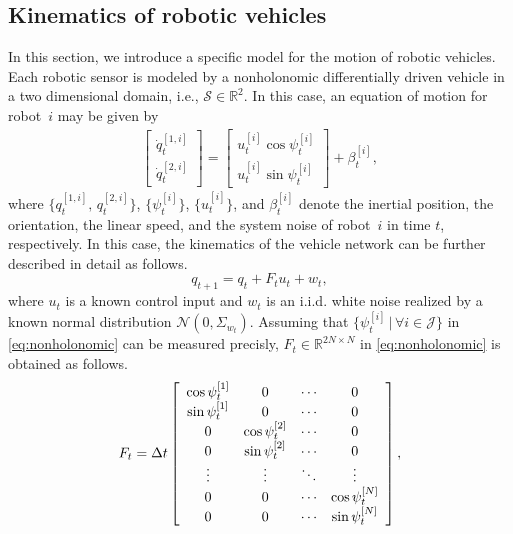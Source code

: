 \documentclass[letterpaper, 10 pt, conference]{ieeeconf}
\newcommand{\set}[1]{\{#1\}} \newcommand{\norm}[1]{\|#1\|}
\newcommand{\mc}[1]{\mathcal{#1}} \newcommand{\mb}[1]{\mathbf{#1}}
\newcommand{\Real}{\mathbb{R}}
\newcommand{\N}{\mc{N}}
\begin{document}
\subsection{Kinematics of robotic vehicles}
In this section, we introduce a specific model for the motion of robotic vehicles.
Each robotic sensor is modeled by a nonholonomic differentially driven vehicle in a two dimensional domain, i.e., $\mc{S} \in \Real^2$. %
In this case, an equation of motion for robot~$i$ %
\cite{ren2007consensus} may be given by
\begin{equation}\label{eq:nonholonomic}
\begin{split}
\left[\begin{array}{c}
 \dot q_t^{[1,i]}\\
 \dot q_t^{[2,i]}
 \end{array}
 \right]=
\left[
\begin{array}{c}
u_t^{[i]} \cos \psi_t^{[i]} \\
 u_t^{[i]} \sin \psi_t^{[i]} 
\end{array}
\right] +\beta_t^{[i]},
\end{split}
\end{equation}
where $\set{q_t^{[1,i]}, \, q_t^{[2,i]}}$, $\set{\psi_t^{[i]}}$, $\set{u_t^{[i]}}$, and $\beta_t^{[i]}$ denote the inertial position, the orientation, the linear speed, and the system noise of robot~$i$ in time $t$, respectively. In this case, the kinematics of the vehicle network can be further described in detail as follows. %
\begin{equation}
q_{t+1} = q_{t} +F_t u_t + w_t,
\label{eq:discrete_vehicle}
\end{equation}
where $u_t$ is {a known control input and $w_t$ is an i.i.d.} white noise realized by a known normal distribution $\N \left(0,\Sigma_{w_t} \right)$. Assuming that $\{ \psi_t^{[i]} \, | \, \forall i \in \mc{J} \}$ in \eqref{eq:nonholonomic} can be measured precisly, $F_t \in \Real^{2N \times N}$ in \eqref{eq:nonholonomic} is obtained as follows.
\begin{equation*}
F_t = \Delta t \left[ 
\begin{array}{c c c c}
\cos \psi_t^{[1]} & 0 & \cdots & 0 \\
\sin \psi_t^{[1]} & 0 & \cdots & 0 \\
0 & \cos \psi_t^{[2]} & \cdots & 0 \\
0 & \sin \psi_t^{[2]} & \cdots & 0 \\
\vdots & \vdots & \ddots & \vdots \\
0 & 0 & \cdots & \cos \psi_t^{[N]} \\
0 & 0 & \cdots & \sin \psi_t^{[N]} \\
\end{array}
\right],
\end{equation*}
\end{document}
